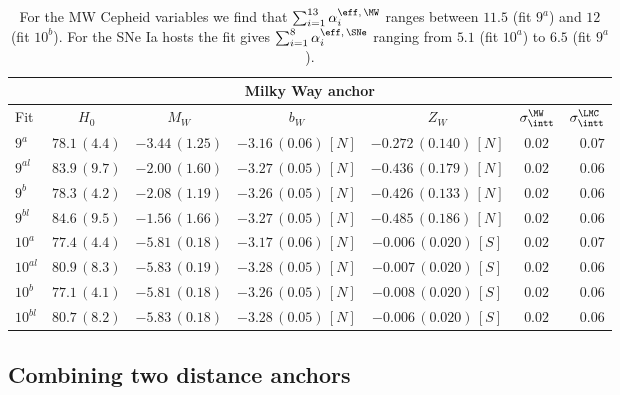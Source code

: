 \begin{table}[tbp]
\centering
\begin{tabular}{@{}lcccccr}
\hline 
\multicolumn{7}{c}{Milky Way anchor} \\
\hline 
Fit & $H_0$ & $M_W$ & $b_W$ & $Z_W$ & $\sigma_{\intt}^{\MW}$ & $\sigma_{\intt}^{\LMC}$ \\
\hline
$9^a$ & $78.1\,(4.4)$& $-3.44\,(1.25)$ & $-3.16\,(0.06)\,[N]$& $-0.272\,(0.140)\,[N]$ & $ 0.02 $ & $0.07$ \\

$9^{al}$ & $83.9\,(9.7)$& $-2.00\,(1.60)$ & $-3.27\,(0.05)\,[N]$& $-0.436\,(0.179)\,[N]$ & $ 0.02$ & $0.06$ \\
 
$9^b$ & $78.3\,(4.2)$& $-2.08\,(1.19)$ & $-3.26\,(0.05)\,[N]$& $-0.426\,(0.133)\,[N]$ & $0.02$ & $0.06$\\

$9^{bl}$ & $84.6\,(9.5)$& $-1.56\,(1.66)$ & $-3.27\,(0.05)\,[N]$& $-0.485\,(0.186)\,[N]$ & $0.02$ & $0.06$\\
  
$10^a$ & $77.4\,(4.4)$& $-5.81\,(0.18)$& $-3.17\,(0.06)\,[N]$& $-0.006\,(0.020)\,[S]$ & $0.02$ & $0.07$ \\

$10^{al}$ & $80.9\,(8.3)$& $-5.83\,(0.19)$& $-3.28\,(0.05)\,[N]$& $-0.007\,(0.020)\,[S]$ & $0.02$ & $0.06$ \\

$10^b$ & $77.1\,(4.1)$& $-5.81\,(0.18)$& $-3.26\,(0.05)\,[N]$& $-0.008\,(0.020)\,[S]$ & $0.02 $ & $0.06$ \\
   
$10^{bl}$ & $80.7\,(8.2)$& $-5.83\,(0.18)$& $-3.28\,(0.05)\,[N]$& $-0.006\,(0.020)\,[S]$ & $0.02 $ & $0.06$ \\
   
\hline   
\end{tabular}
\caption{\label{Table:MW-fits} For the MW Cepheid variables we find that $\sum_{i=1}^{13} \alpha^{\eff,\,\MW}_{i}$ ranges between $11.5$ (fit $9^a$) and $12$ (fit $10^b$). For the SNe Ia hosts the fit gives $\sum_{i=1}^{8} \alpha^{\eff,\,\SNe}_{i}$ ranging from $5.1$ (fit $10^a$) to $6.5$ (fit $9^a$).}
\end{table}

\subsection{Combining two distance anchors}
\label{Subsection-A-Combining-distance-anchors}

